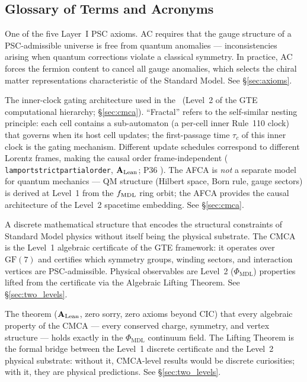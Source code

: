 \documentclass[11pt,openany]{book}
\theoremstyle{remark}
\newcommand{\PHIMDL}{\Phi_{\mathrm{MDL}}}
\newcommand{\lean}[1]{%
  \penalty-100
  \begingroup\def\_{\textunderscore\allowbreak}\texttt{#1}\endgroup}
\newcommand{\CMCA}{\text{CMCA}}
\newcommand{\CatAL}{\ensuremath{\textbf{A}_{\rm Lean}}}
\begin{document}
\begin{appendices}
\chapter{Glossary of Terms and Acronyms}
\label{app:glossary}

\begin{description}[leftmargin=*,font=\bfseries,itemsep=6pt]

\item[AC --- Anomaly Consistency]
One of the five Layer~I PSC axioms.
AC requires that the gauge structure of a PSC-admissible universe is free from
quantum anomalies — inconsistencies arising when quantum corrections violate a
classical symmetry.
In practice, AC forces the fermion content to cancel all gauge anomalies, which
selects the chiral matter representations characteristic of the Standard Model.
See \S\ref{sec:axioms}.

\item[AFCA --- Asynchronous Fractal Cellular Automata]
The inner-clock gating architecture used in the \CMCA\ (Level~2 of the GTE
computational hierarchy; \S\ref{sec:cmca}).
``Fractal'' refers to the self-similar nesting principle: each cell contains a
sub-automaton (a per-cell inner Rule~110 clock) that governs when its host cell
updates; the first-passage time $\tau_c$ of this inner clock is the gating mechanism.
Different update schedules correspond to different Lorentz frames, making the
causal order frame-independent
(\lean{lamport\_strict\_partial\_order}, \CatAL; P36 \cite{SpivackEmergentGravity}).
The AFCA is \emph{not} a separate model for quantum mechanics --- QM structure
(Hilbert space, Born rule, gauge sectors) is derived at Level~1 from the
$f_{\rm MDL}$ ring orbit; the AFCA provides the causal architecture of the
Level~2 spacetime embedding.
See \S\ref{sec:cmca}.

\item[Algebraic certificate (Level~1)]
A discrete mathematical structure that encodes the structural constraints of
Standard Model physics without itself being the physical substrate.
The CMCA is the Level~1 algebraic certificate of the GTE framework: it operates
over $\mathrm{GF}(7)$ and certifies which symmetry groups, winding sectors, and
interaction vertices are PSC-admissible.
Physical observables are Level~2 ($\PHIMDL$) properties lifted from the certificate
via the Algebraic Lifting Theorem.
See \S\ref{sec:two_levels}.

\item[Algebraic Lifting Theorem]
The theorem (\CatAL, zero sorry, zero axioms beyond CIC) that every algebraic
property of the CMCA — every conserved charge, symmetry, and vertex structure —
holds exactly in the $\PHIMDL$ continuum field.
The Lifting Theorem is the formal bridge between the Level~1 discrete certificate
and the Level~2 physical substrate: without it, CMCA-level results would be
discrete curiosities; with it, they are physical predictions.
See \S\ref{sec:two_levels}.


\end{description}
\end{appendices}
\end{document}
